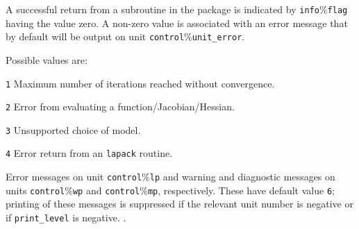 \documentclass{hslspec}
\newcommand{\scalarinteger}{is a scalar of type {\tt INTEGER}}
\begin{document}


\hslerrors

A successful return from a subroutine in the package is indicated by 
{\tt info$\%$flag} having the value zero.  
A non-zero value is associated with an error message that by default will  
be output on unit {\tt control$\%$unit\_error}. 

Possible values are:
\begin{description}
\item{} {\tt 1} Maximum number of iterations reached without convergence.
\item{} {\tt 2} Error from evaluating a function/Jacobian/Hessian.
\item{} {\tt 3} Unsupported choice of model.
\item{} {\tt 4} Error return from an {\tt lapack} routine.
\end{description}

\hslgeneral


\hslio 
   Error messages on unit {\tt control$\%$lp} and warning
   and diagnostic messages on units {\tt control$\%$wp} and {\tt control$\%$mp},
   respectively. These have default value {\tt 6};
   printing of these messages is suppressed if the relevant unit number
   is negative or if {\tt print\_level} is negative.
. 

\hslmethod 
\label{method}


\hslexample

\end{document}
